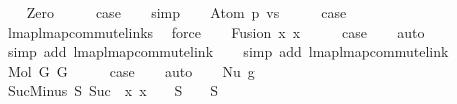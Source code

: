 \begin{isabellebody}
\ \ \isamarkupfalse%
\ Zero\isanewline
\ \ \isamarkupfalse%
\ \isamarkupfalse%
\ {\isacharquery}{\kern0pt}case\isanewline
\ \ \isamarkupfalse%
\ simp\isanewline
{}\isamarkupfalse%
\isanewline
\ \ \isamarkupfalse%
\ {\isacharparenleft}{\kern0pt}Atom\ p\ vs{\isacharparenright}{\kern0pt}\isanewline
\ \ \isamarkupfalse%
\ \isamarkupfalse%
\ {\isacharquery}{\kern0pt}case\isanewline
\ \ \isamarkupfalse%
\ lmap{\isacharunderscore}{\kern0pt}lmap{\isacharunderscore}{\kern0pt}commute{\isacharunderscore}{\kern0pt}links\ \isamarkupfalse%
\ force\isanewline
{}\isamarkupfalse%
\isanewline
\ \ \isamarkupfalse%
\ {\isacharparenleft}{\kern0pt}Fusion\ x{}\ x{}{\isacharparenright}{\kern0pt}\isanewline
\ \ \isamarkupfalse%
\ \isamarkupfalse%
\ {\isacharquery}{\kern0pt}case\isanewline
\ \ \isamarkupfalse%
\ auto\isanewline
\ \ \isamarkupfalse%
\ {\isacharparenleft}{\kern0pt}simp\ add{\isacharcolon}{\kern0pt}\ lmap{\isacharunderscore}{\kern0pt}lmap{\isacharunderscore}{\kern0pt}commute{\isacharunderscore}{\kern0pt}link{\isacharparenright}{\kern0pt}\isanewline
\ \ \isamarkupfalse%
\ {\isacharparenleft}{\kern0pt}simp\ add{\isacharcolon}{\kern0pt}\ lmap{\isacharunderscore}{\kern0pt}lmap{\isacharunderscore}{\kern0pt}commute{\isacharunderscore}{\kern0pt}link{\isacharparenright}{\kern0pt}\isanewline
{}\isamarkupfalse%
\isanewline
\ \ \isamarkupfalse%
\ {\isacharparenleft}{\kern0pt}Mol\ G{}\ G{}{\isacharparenright}{\kern0pt}\isanewline
\ \ \isamarkupfalse%
\ \isamarkupfalse%
\ {\isacharquery}{\kern0pt}case\isanewline
\ \ \isamarkupfalse%
\ auto\isanewline
{}\isamarkupfalse%
\isanewline
\ \ \isamarkupfalse%
\ {\isacharparenleft}{\kern0pt}Nu\ g{\isacharparenright}{\kern0pt}\isanewline
\isanewline
\ \ \isamarkupfalse%
\ SucMinus{\isacharcolon}{\kern0pt}\ {\isachardoublequoteopen}{\isasymforall}S{\isachardot}{\kern0pt}\ Suc\ {\isacharbackquote}{\kern0pt}\ {\isacharparenleft}{\kern0pt}{\isasymlambda}x{\isachardot}{\kern0pt}\ x\ {\isacharminus}{\kern0pt}\ {}{\isacharparenright}{\kern0pt}\ {\isacharbackquote}{\kern0pt}\ {\isacharparenleft}{\kern0pt}S\ {\isacharminus}{\kern0pt}\ {\isacharbraceleft}{\kern0pt}{}{\isacharbraceright}{\kern0pt}{\isacharparenright}{\kern0pt}\ {\isacharequal}{\kern0pt}\ S\ {\isacharminus}{\kern0pt}\ {\isacharbraceleft}{\kern0pt}{}{\isacharbraceright}{\kern0pt}{\isachardoublequoteclose}\isanewline

\end{isabellebody}
